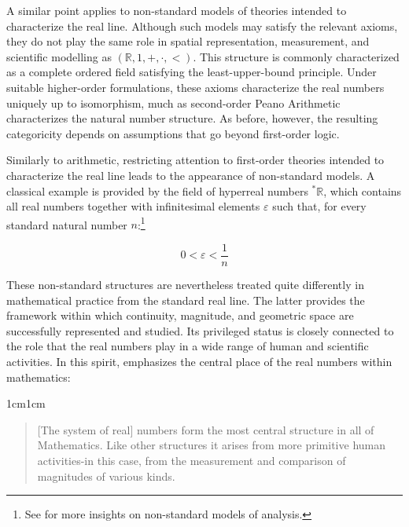\documentclass[11pt,a4paper]{article}
\begin{document}
A similar point applies to non-standard models of theories intended to characterize the real line. Although such models may satisfy the relevant axioms, they do not play the same role in spatial representation, measurement, and scientific modelling as $(\mathbb{R},1, +, \cdot, <)$. This structure is commonly characterized as a complete ordered field satisfying the least-upper-bound principle. Under suitable higher-order formulations, these axioms characterize the real numbers uniquely up to isomorphism, much as second-order Peano Arithmetic characterizes the natural number structure. As before, however, the resulting categoricity depends on assumptions that go beyond first-order logic.

Similarly to arithmetic, restricting attention to first-order theories intended to characterize the real line leads to the appearance of non-standard models. A classical example is provided by the field of hyperreal numbers $^*\mathbb{R}$, which contains all real numbers together with infinitesimal elements $\varepsilon$ such that, for every standard natural number $n$:\footnote{See \textcite{robinson1966nonstandard} for more insights on non-standard models of analysis.}

$$ 0 < \varepsilon < \frac{1}{n} $$

These non-standard structures are nevertheless treated quite differently in mathematical practice from the standard real line. The latter provides the framework within which continuity, magnitude, and geometric space are successfully represented and studied. Its privileged status is closely connected to the role that the real numbers play in a wide range of human and scientific activities. In this spirit, \textcite[93]{maclane1986mathematics} emphasizes the central place of the real numbers within mathematics:

\begin{adjustwidth}{1cm}{1cm}
\small
\begin{quote}
[The system of real] numbers form the most central structure in all of Mathematics. Like other structures it arises from more primitive human activities-in this case, from the measurement and comparison of magnitudes of various kinds.
\end{quote}
\end{adjustwidth}
\end{document}
